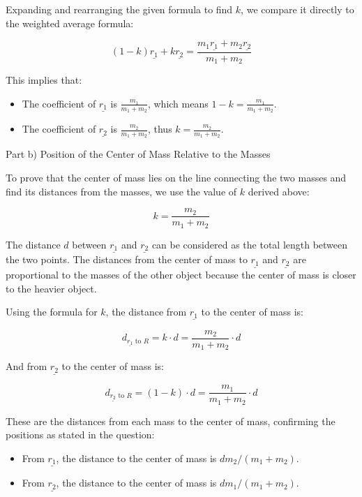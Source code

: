 Expanding and rearranging the given formula to find \( k \), we compare it directly to the weighted average formula:

\[ (1-k)\underline{r_{1}} + k\underline{r_{2}} = \frac{m_{1}\underline{r_{1}} + m_{2}\underline{r_{2}}}{m_{1} + m_{2}} \]

This implies that:

\begin{itemize}
    \item The coefficient of \( \underline{r_{1}} \) is \( \frac{m_{1}}{m_{1} + m_{2}} \), which means \( 1-k = \frac{m_{1}}{m_{1} + m_{2}} \).
    \item The coefficient of \( \underline{r_{2}} \) is \( \frac{m_{2}}{m_{1} + m_{2}} \), thus \( k = \frac{m_{2}}{m_{1} + m_{2}} \).
\end{itemize}

Part b) Position of the Center of Mass Relative to the Masses

To prove that the center of mass lies on the line connecting the two masses and find its distances from the masses, we use the value of \( k \) derived above:

\[ k = \frac{m_{2}}{m_{1} + m_{2}} \]

The distance \( d \) between \( \underline{r_{1}} \) and \( \underline{r_{2}} \) can be considered as the total length between the two points. The distances from the center of mass to \( \underline{r_{1}} \) and \( \underline{r_{2}} \) are proportional to the masses of the other object because the center of mass is closer to the heavier object.

Using the formula for \( k \), the distance from \( \underline{r_{1}} \) to the center of mass is:

\[ d_{\underline{r_{1}}\text{ to }R} = k \cdot d = \frac{m_{2}}{m_{1} + m_{2}} \cdot d \]

And from \( \underline{r_{2}} \) to the center of mass is:

\[ d_{\underline{r_{2}}\text{ to }R} = (1 - k) \cdot d = \frac{m_{1}}{m_{1} + m_{2}} \cdot d \]

These are the distances from each mass to the center of mass, confirming the positions as stated in the question:

\begin{itemize}
    \item From \( \underline{r_{1}} \), the distance to the center of mass is \( d m_{2}/(m_{1}+m_{2}) \).
    \item From \( \underline{r_{2}} \), the distance to the center of mass is \( d m_{1}/(m_{1}+m_{2}) \).
\end{itemize}

